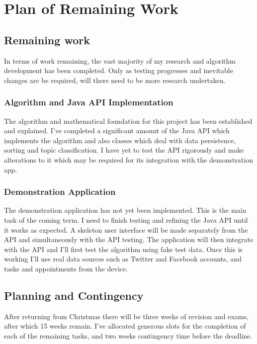 \chapter{Plan of Remaining Work}

\section{Remaining work}

In terms of work remaining, the vast majority of my research and algorithm development has been completed. Only as testing progresses and inevitable changes are be required, will there need to be more research undertaken.

\subsection{Algorithm and Java API Implementation}

The algorithm and mathematical foundation for this project has been established and explained. I've completed a significant amount of the Java API which implements the algorithm and also classes which deal with data persistence, sorting and topic classification. I have yet to test the API rigorously and make alterations to it which may be required for its integration with the demonstration app. 

\subsection{Demonstration Application}

The demonstration application has not yet been implemented. This is the main task of the coming term. I need to finish testing and refining the Java API until it works as expected. A skeleton user interface will be made separately from the API and simultaneously with the API testing. The application will then integrate with the API and I'll first test the algorithm using fake test data. Once this is working I'll use real data sources such as Twitter and Facebook accounts, and  tasks and appointments from the device. 

\section{Planning and Contingency}

After returning from Christmas there will be three weeks of revision and exams, after which 15 weeks remain. I've allocated generous slots for the completion of each of the remaining tasks, and two weeks contingency time before the deadline. 


